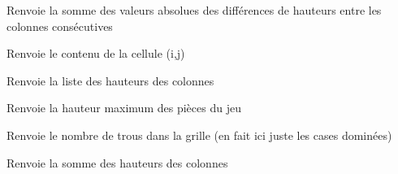 \documentclass[letterpaper,10pt,french]{sphinxmanual}
\begin{document}
\begin{fulllineitems}

\begin{fulllineitems}
\label{\detokenize{index:board.Board.getBumpiness}}
Renvoie la somme des valeurs absolues des différences
de hauteurs entre les colonnes consécutives

\end{fulllineitems}


\begin{fulllineitems}
\label{\detokenize{index:board.Board.getCell}}
Renvoie le contenu de la cellule (i,j)

\end{fulllineitems}


\begin{fulllineitems}
\label{\detokenize{index:board.Board.getColumnHeights}}
Renvoie la liste des hauteurs des colonnes

\end{fulllineitems}


\begin{fulllineitems}
\label{\detokenize{index:board.Board.getMaxHeight}}
Renvoie la hauteur maximum des pièces du jeu

\end{fulllineitems}


\begin{fulllineitems}
\label{\detokenize{index:board.Board.getNbHoles}}
Renvoie le nombre de trous dans la grille
(en fait ici juste les cases dominées)

\end{fulllineitems}


\begin{fulllineitems}
\label{\detokenize{index:board.Board.getSumHeights}}
Renvoie la somme des hauteurs des colonnes


\end{fulllineitems}
\end{fulllineitems}
\end{document}
